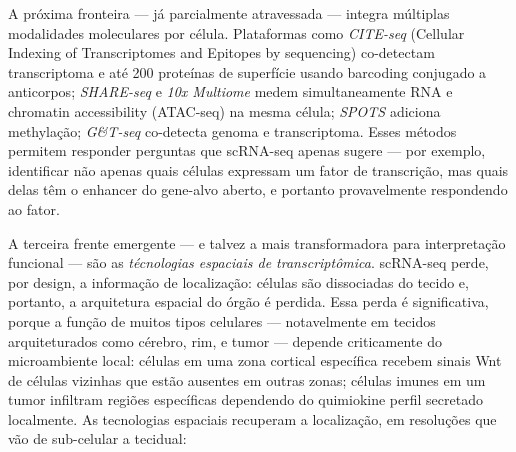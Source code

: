 
A próxima fronteira --- já parcialmente atravessada --- integra múltiplas modalidades moleculares por célula. Plataformas como \emph{CITE-seq} (Cellular Indexing of Transcriptomes and Epitopes by sequencing) co-detectam transcriptoma e até 200 proteínas de superfície usando barcoding conjugado a anticorpos; \emph{SHARE-seq} e \emph{10x Multiome} medem simultaneamente RNA e chromatin accessibility (ATAC-seq) na mesma célula; \emph{SPOTS} adiciona methylação; \emph{G\&T-seq} co-detecta genoma e transcriptoma. Esses métodos permitem responder perguntas que scRNA-seq apenas sugere --- por exemplo, identificar não apenas quais células expressam um fator de transcrição, mas quais delas têm o enhancer do gene-alvo aberto, e portanto provavelmente respondendo ao fator.



A terceira frente emergente --- e talvez a mais transformadora para interpretação funcional --- são as \emph{técnologias espaciais de transcriptômica}. scRNA-seq perde, por design, a informação de localização: células são dissociadas do tecido e, portanto, a arquitetura espacial do órgão é perdida. Essa perda é significativa, porque a função de muitos tipos celulares --- notavelmente em tecidos arquiteturados como cérebro, rim, e tumor --- depende criticamente do microambiente local: células em uma zona cortical específica recebem sinais Wnt de células vizinhas que estão ausentes em outras zonas; células imunes em um tumor infiltram regiões específicas dependendo do quimiokine perfil secretado localmente. As tecnologias espaciais recuperam a localização, em resoluções que vão de sub-celular a tecidual:

